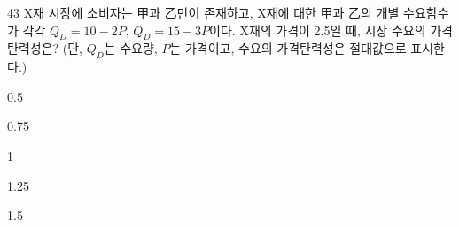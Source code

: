 \begin{question}{43}
X재 시장에 소비자는 甲과 乙만이 존재하고, X재에 대한 甲과 乙의 개별 수요함수가 각각 $Q_D = 10 - 2P$, $Q_D = 15 - 3P$이다. X재의 가격이 2.5일 때, 시장 수요의 가격탄력성은? (단, $Q_D$는 수요량, $P$는 가격이고, 수요의 가격탄력성은 절대값으로 표시한다.)
\begin{choices}
  \item 0.5
  \item 0.75
  \item 1
  \item 1.25
  \item 1.5
\end{choices}
\end{question}
